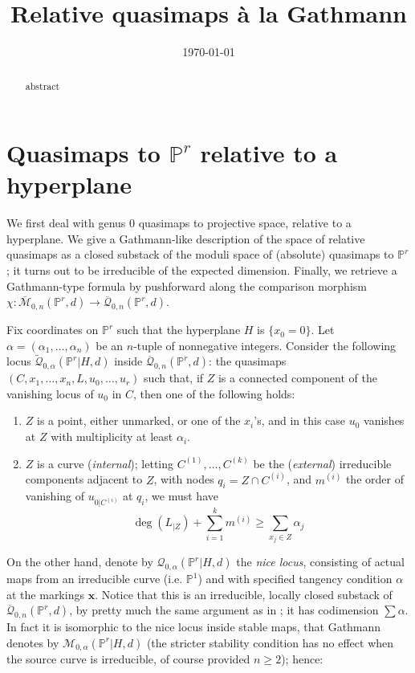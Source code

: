 \documentclass[11pt]{amsart}
\title{Relative quasimaps \`a la Gathmann}
\date{\today}
\newcommand{\M}[4]{\overline{\mathcal M}_{#1,#2}(#3,#4)}
\newcommand{\Q}[4]{\overline{\mathcal Q}_{#1,#2}(#3,#4)}
\newcommand{\Qt}[4]{\widetilde{\mathcal Q}_{#1,#2}(#3,#4)}
\newcommand{\PP}{\mathbb P}
\renewcommand{\to}{\rightarrow}
\newcommand{\comp}{\chi}
\theoremstyle{plain}
\theoremstyle{definition}
\begin{document}
\maketitle
\begin{abstract}
abstract
\end{abstract}

\section{Quasimaps to $\PP^r$ relative to a hyperplane}

We first deal with genus 0 quasimaps to projective space, relative to a hyperplane. We give a Gathmann-like description of the space of relative quasimaps as a closed substack of the moduli space of (absolute) quasimaps to $\PP^r$; it turns out to be irreducible of the expected dimension. Finally, we retrieve a Gathmann-type formula by pushforward along the comparison morphism $\comp\colon \M{0}{n}{\PP^r}{d}\to\Q{0}{n}{\PP^r}{d}$.

Fix coordinates on $\PP^r$ such that the hyperplane $H$ is $\{x_0=0\}$. Let $\alpha=(\alpha_1,\ldots,\alpha_n)$ be an $n$-tuple of nonnegative integers. Consider the following locus $\Qt{0}{\alpha}{\PP^r|H}{d}$ inside $\Q{0}{n}{\PP^r}{d}$: the quasimaps $(C,x_1,\ldots,x_n,L,u_0,\ldots,u_r)$ such that, if $Z$ is a connected component of the vanishing locus of $u_0$ in $C$, then one of the following holds:

\begin{enumerate}
\item $Z$ is a point, either unmarked, or one of the $x_i$'s, and in this case $u_0$ vanishes at $Z$ with multiplicity at least $\alpha_i$.
\item $Z$ is a curve (\emph{internal}); letting $C^{(1)},\ldots,C^{(k)}$ be the (\emph{external}) irreducible components adjacent to $Z$, with nodes $q_i=Z\cap C^{(i)}$, and $m^{(i)}$ the order of vanishing of $u_{0|C^{(i)}}$ at $q_i$, we must have
\[
\deg(L_{|Z})+\sum_{i=1}^k m^{(i)}\geq\sum_{x_j\in Z} \alpha_j
\]
\end{enumerate}

On the other hand, denote by $\mathcal Q_{0,\alpha}(\PP^r|H,d)$ the \emph{nice locus}, consisting of actual maps from an irreducible curve (i.e. $\PP^1$) and with specified tangency condition $\alpha$ at the markings $\mathbf x$. Notice that this is an irreducible, locally closed substack of $\Q{0}{n}{\PP^r}{d}$, by pretty much the same argument as in \cite[Lemma 1.8]{Ga}; it has codimension $\sum\alpha$. In fact it is isomorphic to the nice locus inside stable maps, that Gathmann denotes by $\mathcal M_{0,\alpha}(\PP^r|H,d)$ \cite[Def. 1.6]{Ga} (the stricter stability condition has no effect when the source curve is irreducible, of course provided $n\geq2$); hence:
\end{document}
